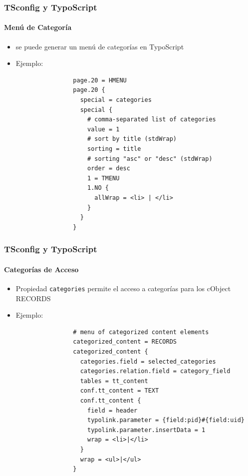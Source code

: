 
\begin{frame}[fragile]
	\frametitle{TSconfig y TypoScript}
	\framesubtitle{Menú de Categoría}

	\begin{itemize}
		\item se puede generar un menú de categorías en TypoScript

		\item Ejemplo:

			\lstset{
				basicstyle=\tiny\ttfamily
			}

			\begin{lstlisting}
				page.20 = HMENU
				page.20 {
				  special = categories
				  special {
				    # comma-separated list of categories
				    value = 1
				    # sort by title (stdWrap)
				    sorting = title
				    # sorting "asc" or "desc" (stdWrap)
				    order = desc
				    1 = TMENU
				    1.NO {
				      allWrap = <li> | </li>
				    }
				  }
				}
			\end{lstlisting}

	\end{itemize}

\end{frame}


\begin{frame}[fragile]
	\frametitle{TSconfig y TypoScript}
	\framesubtitle{Categorías de Acceso}

	\begin{itemize}
		\item Propiedad \texttt{categories} permite el acceso a categorías\newline
			para los cObject RECORDS

		\item Ejemplo:

			\lstset{
				basicstyle=\tiny\ttfamily
			}

			\begin{lstlisting}
				# menu of categorized content elements
				categorized_content = RECORDS
				categorized_content {
				  categories.field = selected_categories
				  categories.relation.field = category_field
				  tables = tt_content
				  conf.tt_content = TEXT
				  conf.tt_content {
				    field = header
				    typolink.parameter = {field:pid}#{field:uid}
				    typolink.parameter.insertData = 1
				    wrap = <li>|</li>
				  }
				  wrap = <ul>|</ul>
				}
			\end{lstlisting}

	\end{itemize}

\end{frame}

